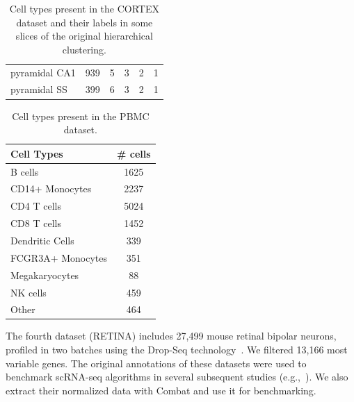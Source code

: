 \begin{table}[ht]
{\begin{small}
\begin{tabular}{lccccc}
    pyramidal CA1         & 939      & 5                                                                & 3                                                          & 2                                                          & 1                                                          \\
    pyramidal SS          & 399      & 6                                                                & 3                                                          & 2                                                          & 1                                                         \\
    \bottomrule
    \end{tabular}
\end{small}
    }
    \caption{Cell types present in the CORTEX dataset and their labels in some slices of the original hierarchical clustering.}
    \label{scvicortex-celltypes}
    \end{table}

\begin{table}[ht]
    \centering
    \begin{small}
    \begin{tabular}{lc}
        \toprule
        \bfseries Cell Types        & \bfseries \# cells \\
    \midrule
    B cells           & 1625     \\
    CD14+ Monocytes   & 2237     \\
    CD4 T cells       & 5024     \\
    CD8 T cells       & 1452     \\
    Dendritic Cells   & 339      \\
    FCGR3A+ Monocytes & 351      \\
    Megakaryocytes    & 88       \\
    NK cells          & 459      \\
    Other             & 464     \\
    \bottomrule
    \end{tabular}
\end{small}
    \caption{Cell types present in the PBMC dataset.}
    \label{scvipbmc-celltypes}
    \end{table}

The fourth dataset (RETINA) includes 27,499 mouse retinal bipolar neurons, profiled in two batches using the Drop-Seq technology~\cite{bipolar}. We filtered 13,166 most variable genes. The original annotations of these datasets were used to benchmark scRNA-seq algorithms in several subsequent studies (e.g.,~\cite{Wang2017,biscuit}). We also extract their normalized data with Combat and use it for benchmarking.

